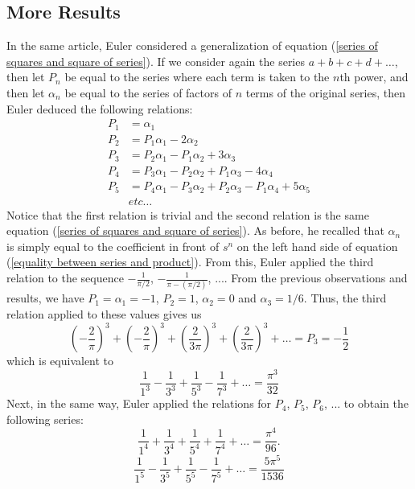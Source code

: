 \subsection*{More Results}
In the same article, Euler considered a generalization of equation (\ref{series of squares and square of series}). If we consider again the series $a + b + c + d + \dots$, then let $P_n$ be equal to the series where each term is taken to the $n$th power, and then let $\alpha_n$ be equal to the series of factors of $n$ terms of the original series, then Euler deduced the following relations:
\begin{align*}
    P_1 &= \alpha_1 \\
    P_2 &= P_1 \alpha_1 - 2 \alpha_2 \\
    P_3 &= P_2 \alpha_1 - P_1 \alpha_2 + 3\alpha_3 \\
    P_4 &= P_3 \alpha_1 - P_2 \alpha_2 + P_1 \alpha_3 - 4\alpha_4 \\ 
    P_5 &= P_4 \alpha_1 - P_3 \alpha_2 + P_2 \alpha_3 - P_1 \alpha_4 + 5\alpha_5 \\
    & etc \dots 
\end{align*}
Notice that the first relation is trivial and the second relation is the same equation (\ref{series of squares and square of series}). As before, he recalled that $\alpha_n$ is simply equal to the coefficient in front of $s^n$ on the left hand side of equation (\ref{equality between series and product}). From this, Euler applied the third relation to the sequence $-\frac{1}{\pi/2}$, $-\frac{1}{\pi - (\pi/2)}$, .... From the previous observations and results, we have $P_1 = \alpha_1 =  -1$, $P_2 = 1$, $\alpha_2 = 0$ and $\alpha_3 = 1/6$. Thus, the third relation applied to these values gives us
$$\left(-\frac{2}{\pi}\right)^3 + \left(-\frac{2}{\pi}\right)^3 + \left(\frac{2}{3\pi}\right)^3 + \left(\frac{2}{3\pi}\right)^3 + \dots = P_3 = -\frac{1}{2}$$
which is equivalent to
\begin{equation} \label{closely zeta-3}
    \frac{1}{1^3} - \frac{1}{3^3} + \frac{1}{5^3} - \frac{1}{7^3} + \dots = \frac{\pi^3}{32}
\end{equation}
Next, in the same way, Euler applied the relations for $P_4$, $P_5$, $P_6$, ... to obtain the following series:
\begin{equation}\label{zeta-4 but only odd numbers}
    \frac{1}{1^4} + \frac{1}{3^4} + \frac{1}{5^4} + \frac{1}{7^4} + \dots = \frac{\pi^4}{96}.
\end{equation}
\begin{equation} \label{closely zeta-5}
    \frac{1}{1^5} - \frac{1}{3^5} + \frac{1}{5^5} - \frac{1}{7^5} + \dots = \frac{5\pi^5}{1536}
\end{equation}
